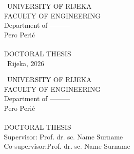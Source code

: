 \documentclass[12pt,a4paper]{article}
\date{}
\begin{document}

	
	\thispagestyle{empty}
	\centering
	\fontsize{16}{17.5}\selectfont\
	{UNIVERSITY OF RIJEKA}\\
	{ FACULTY OF ENGINEERING}\\
	{ Department of ---------}\\ %
	\vspace{5cm}
	{Pero Perić}\\
	\vspace{1cm}
	{\fontsize{22}{23.5}}\\
	\vspace{1cm}
	{DOCTORAL THESIS}\\

	\vfill
	\fontsize{16}{17.5}\selectfont\
	{Rijeka, 2026}\\ %
	


{}
\newpage
\-
\thispagestyle{empty}
\newpage

\thispagestyle{empty}
\centering

\fontsize{16}{17.5}\selectfont\
{UNIVERSITY OF RIJEKA}\\

{ FACULTY OF ENGINEERING}\\

{ Department of ---------}\\
\vspace{5cm}
{Pero Perić}\\
\vspace{1cm}
{\fontsize{22}{23.5}}\\
\vspace{1cm}
{DOCTORAL THESIS}\\
\vspace{3cm}
{Supervisor: Prof. dr. sc. Name Surname}\\
\vspace{0.4cm}
{Co-supervisor:Prof. dr. sc. Name Surname}
\end{document}
